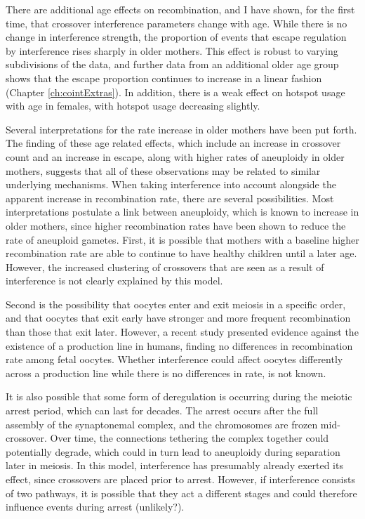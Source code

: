 There are additional age effects on recombination, and 
I have shown, for the first time, that crossover interference parameters change with age.
While there is no change in interference strength, the proportion of events that escape regulation by interference rises sharply in older mothers.
This effect is robust to varying subdivisions of the data, and further data from an additional older age group shows that the escape proportion continues to increase in a linear fashion (Chapter \ref{ch:cointExtras}).
In addition, there is a weak effect on hotspot usage with age in females, with hotspot usage decreasing slightly.


Several interpretations for the rate increase in older mothers have been put forth.
The finding of these age related effects, which include an increase in crossover count and an increase in escape, along with higher rates of aneuploidy in older mothers\cite{Hassold2001}, suggests that all of these observations may be related to similar underlying mechanisms.
When taking interference into account alongside the apparent increase in recombination rate, there are several possibilities.
Most interpretations postulate a link between aneuploidy, which is known to increase in older mothers, since higher recombination rates have been shown to reduce the rate of aneuploid gametes\cite{Hassold2001}.
First, it is possible that mothers with a baseline higher recombination rate are able to continue to have healthy children until a later age\cite{Kong2004}.
However, the increased clustering of crossovers that are seen as a result of interference is not clearly explained by this model.

Second is the possibility that oocytes enter and exit meiosis in a specific order, and that oocytes that exit early have stronger and more frequent recombination than those that exit later.
However, a recent study presented evidence against the existence of a production line in humans, finding no differences in recombination rate among fetal oocytes\cite{Rowsey2014}.
Whether interference could affect oocytes differently across a production line while there is no differences in rate, is not known.

It is also possible that some form of deregulation is occurring during the meiotic arrest period, which can last for decades.
The arrest occurs after the full assembly of the synaptonemal complex, and the chromosomes are frozen mid-crossover.
Over time, the connections tethering the complex together could potentially degrade, which could in turn lead to aneuploidy during separation later in meiosis.
In this model, interference has presumably already exerted its effect, since crossovers are placed prior to arrest.
However, if interference consists of two pathways, it is possible that they act a different stages and could therefore influence events during arrest (unlikely?).

